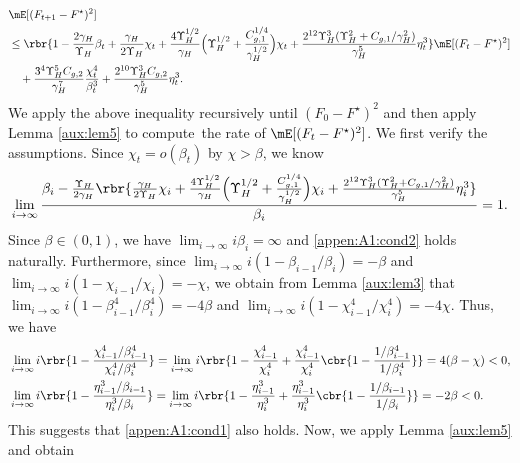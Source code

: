 \begin{align*}
&\mE[(F_{t+1}-F^\star)^2] \\
& \leq \rbr{1-
\frac{2\gamma_H}{\Upsilon_H}\beta_t+\frac{\gamma_H}{2\Upsilon_H}\chi_t+ \frac{4\Upsilon_H^{1/2}}{\gamma_H}\Big(\Upsilon_H^{1/2}+ \frac{C_{g,1}^{1/4}}{\gamma_H^{1/2}}\Big)\chi_t + \frac{2^{12}\Upsilon_{H}^3(\Upsilon_{H}^2+C_{g,1}/\gamma_H^2)}{\gamma_H^5}\eta_t^3}\mE[(F_{t}-F^\star)^2]\\
& \quad +\frac{3^4\Upsilon_H^5C_{g,2}}{\gamma_H^7}\frac{\chi_t^4}{\beta_t^3}  + \frac{2^{10}\Upsilon_H^3C_{g,2}}{\gamma_H^5} \eta_t^3.
\end{align*}
We apply the above inequality recursively until $(F_0 - F^\star)^2$ and then apply Lemma \ref{aux:lem5} to compute~the rate of $\mE[(F_t-F^\star)^2]$. We first verify the assumptions. Since $\chi_t = o(\beta_t)$ by $\chi>\beta$, we know
\begin{equation*}
\lim_{i\rightarrow\infty}\frac{\beta_i - \frac{\Upsilon_H}{2\gamma_H}\rbr{\frac{\gamma_H}{2\Upsilon_H}\chi_i+\frac{4\Upsilon_H^{1/2}}{\gamma_H}\Big(\Upsilon_H^{1/2}+ \frac{C_{g,1}^{1/4}}{\gamma_H^{1/2}}\Big)\chi_i+ \frac{2^{12}\Upsilon_{H}^3(\Upsilon_{H}^2+C_{g,1}/\gamma_H^2)}{\gamma_H^5}\eta_i^3}}{\beta_i} = 1.
\end{equation*}
Since $\beta\in(0,1)$, we have $\lim_{i\rightarrow\infty}i\beta_i=\infty$ and \eqref{appen:A1:cond2} holds naturally. Furthermore, since $\lim_{i\rightarrow\infty}i(1-\beta_{i-1}/\beta_i)=-\beta$ and $\lim_{i\rightarrow\infty}i(1-\chi_{i-1}/\chi_i)=-\chi$, we obtain from Lemma \ref{aux:lem3} that $\lim_{i\rightarrow\infty}i(1-\beta_{i-1}^4/\beta_i^4)=-4\beta$ and $\lim_{i\rightarrow\infty}i(1-\chi_{i-1}^4/\chi_i^4)=-4\chi$. Thus, we have
\begin{equation*}
\begin{aligned}
&\lim_{i \rightarrow\infty} i\rbr{1-\frac{\chi_{i-1}^4/\beta_{i-1}^4}{\chi_i^4/\beta_i^4}}  = \lim_{i \rightarrow\infty} i\rbr{1-\frac{\chi_{i-1}^4}{\chi_{i}^4} + \frac{\chi_{i-1}^4}{\chi_{i}^4}\cbr{1-\frac{1/\beta_{i-1}^4}{1/\beta_i^4}}} = 4(\beta-\chi)<0, \\
&\lim_{i \rightarrow\infty} i\rbr{1-\frac{\eta_{i-1}^3/\beta_{i-1}}{\eta_i^3/\beta_i}}  = \lim_{i \rightarrow\infty} i\rbr{1-\frac{\eta_{i-1}^3}{\eta_{i}^3} + \frac{\eta_{i-1}^3}{\eta_{i}^3}\cbr{1-\frac{1/\beta_{i-1}}{1/\beta_i}}} = -2\beta<0.
\end{aligned}	
\end{equation*}
This suggests that \eqref{appen:A1:cond1} also holds. Now, we apply Lemma \ref{aux:lem5} and obtain
